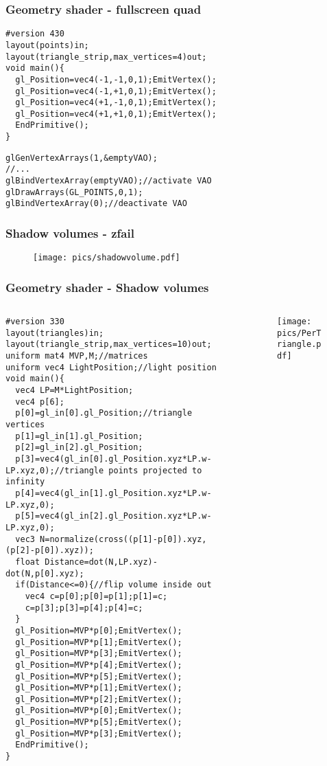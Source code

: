 \begin{frame}[fragile]
\frametitle{Geometry shader - fullscreen quad}
	{\scriptsize
	\begin{verbatim}
#version 430
layout(points)in;
layout(triangle_strip,max_vertices=4)out;
void main(){
  gl_Position=vec4(-1,-1,0,1);EmitVertex();
  gl_Position=vec4(-1,+1,0,1);EmitVertex();
  gl_Position=vec4(+1,-1,0,1);EmitVertex();
  gl_Position=vec4(+1,+1,0,1);EmitVertex();
  EndPrimitive();
}
	\end{verbatim}
	}
	{\scriptsize
	\begin{verbatim}
glGenVertexArrays(1,&emptyVAO);
//...
glBindVertexArray(emptyVAO);//activate VAO
glDrawArrays(GL_POINTS,0,1);
glBindVertexArray(0);//deactivate VAO
	\end{verbatim}
	}
\end{frame}

\begin{frame}[fragile]
\frametitle{Shadow volumes - zfail}
  \begin{figure}[h]
    \texttt{[image: pics/shadowvolume.pdf]}
  \end{figure}
\end{frame}

\begin{frame}[fragile]
\frametitle{Geometry shader - Shadow volumes}
  \begin{columns}[T]
    \begin{column}{.44\textwidth}
	    {\tiny
      	\begin{verbatim}
#version 330
layout(triangles)in;
layout(triangle_strip,max_vertices=10)out;
uniform mat4 MVP,M;//matrices
uniform vec4 LightPosition;//light position
void main(){
  vec4 LP=M*LightPosition;
  vec4 p[6];
  p[0]=gl_in[0].gl_Position;//triangle vertices
  p[1]=gl_in[1].gl_Position;
  p[2]=gl_in[2].gl_Position;
  p[3]=vec4(gl_in[0].gl_Position.xyz*LP.w-LP.xyz,0);//triangle points projected to infinity
  p[4]=vec4(gl_in[1].gl_Position.xyz*LP.w-LP.xyz,0);
  p[5]=vec4(gl_in[2].gl_Position.xyz*LP.w-LP.xyz,0);
  vec3 N=normalize(cross((p[1]-p[0]).xyz,(p[2]-p[0]).xyz));
  float Distance=dot(N,LP.xyz)-dot(N,p[0].xyz);
  if(Distance<=0){//flip volume inside out
    vec4 c=p[0];p[0]=p[1];p[1]=c;
    c=p[3];p[3]=p[4];p[4]=c;
  }
  gl_Position=MVP*p[0];EmitVertex();
  gl_Position=MVP*p[1];EmitVertex();
  gl_Position=MVP*p[3];EmitVertex();
  gl_Position=MVP*p[4];EmitVertex();
  gl_Position=MVP*p[5];EmitVertex();
  gl_Position=MVP*p[1];EmitVertex();
  gl_Position=MVP*p[2];EmitVertex();
  gl_Position=MVP*p[0];EmitVertex();
  gl_Position=MVP*p[5];EmitVertex();
  gl_Position=MVP*p[3];EmitVertex();
  EndPrimitive();
}
    	\end{verbatim}
   	}
    \end{column}
    \begin{column}{.48\textwidth}
	    \begin{figure}[h]
    		\texttt{[image: pics/PerTriangle.pdf]}
    	\end{figure}
    \end{column}
  \end{columns}

\end{frame}

